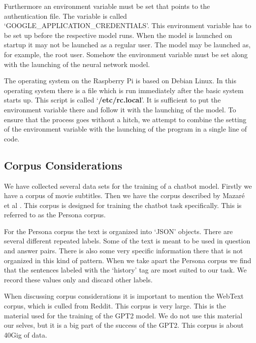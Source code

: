 Furthermore an environment variable must be set that points to the authentication file. The variable is called `GOOGLE\_APPLICATION\_CREDENTIALS'. This environment variable has to be set up before the respective model runs. When the model is launched on startup it may not be launched as a regular user. The model may be launched as, for example, the root user. Somehow the environment variable must be set along with the launching of the neural network model.

The operating system on the Raspberry Pi is based on Debian Linux. In this operating system there is a file which is run immediately after the basic system starts up. This script is called `\textbf{/etc/rc.local}'. It is sufficient to put the environment variable there and follow it with the launching of the model. To ensure that the process goes without a hitch, we attempt to combine the setting of the environment variable with the launching of the program in a single line of code.


\subsection{Corpus Considerations}

We have collected several data sets for the training of a chatbot model. Firstly we have a corpus of movie subtitles. Then we have the corpus described by Mazar{\'{e}} et al \cite{DBLP:journals/corr/abs-1809-01984}. This corpus is designed for training the chatbot task specifically. This is referred to as the Persona corpus.

For the Persona corpus the text is organized into `JSON' objects. There are several different repeated labels. Some of the text is meant to be used in question and answer pairs. There is also some very specific information there that is not organized in this kind of pattern. When we take apart the Persona corpus we find that the sentences labeled with the `history' tag are most suited to our task. We record these values only and discard other labels.

When discussing corpus considerations it is important to mention the WebText corpus, which is culled from Reddit. This corpus is very large. This is the material used for the training of the GPT2 model. We do not use this material our selves, but it is a big part of the success of the GPT2. This corpus is about 40Gig of data.


